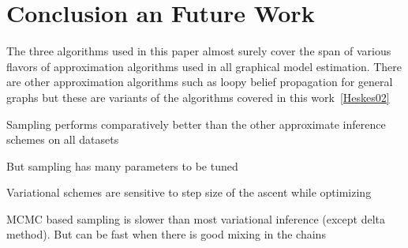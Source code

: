 
\section{Conclusion an Future Work}
The three algorithms used in this paper almost surely cover the
span of various flavors of approximation algorithms used in all graphical model
estimation. There are other approximation algorithms such as loopy belief
propagation for general graphs but these are variants of the algorithms covered
in this work~\ref{Heskes02}

Sampling performs
comparatively better than the other approximate inference schemes on all datasets

    But sampling has many parameters to be tuned

    Variational schemes are sensitive to step size of the ascent while optimizing

    MCMC based sampling is slower than most variational inference (except delta method).
    But can be fast when there is good mixing in the chains